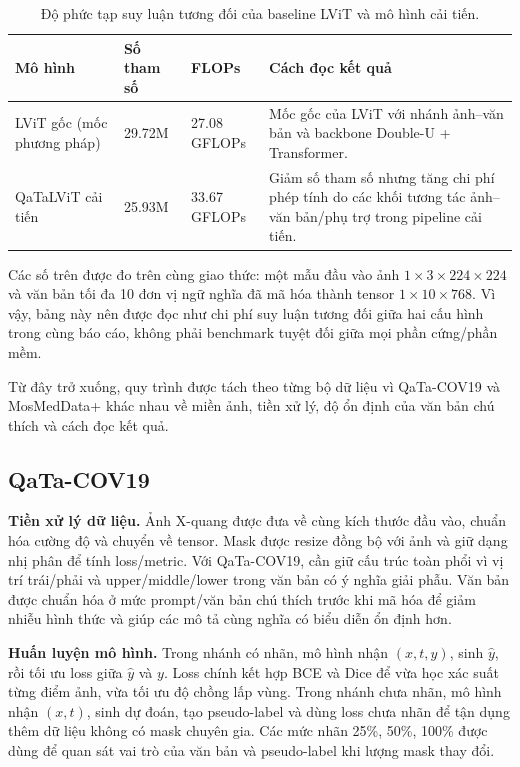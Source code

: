 \begin{table}[H]
  \centering
  \caption{Độ phức tạp suy luận tương đối của baseline LViT và mô hình cải tiến.}
  \label{tab:complexity-comparison}
  \small
  \renewcommand{\arraystretch}{1.15}
  \setlength{\tabcolsep}{4pt}
  \begin{tabularx}{\textwidth}{@{}p{} Y Y Y@{}}
    \toprule
    Mô hình & Số tham số & FLOPs & Cách đọc kết quả \\
    \midrule
    LViT gốc (mốc phương pháp) & 29.72M & 27.08 GFLOPs & Mốc gốc của LViT với nhánh ảnh--văn bản và backbone Double-U + Transformer. \\
    QaTaLViT cải tiến & 25.93M & 33.67 GFLOPs & Giảm số tham số nhưng tăng chi phí phép tính do các khối tương tác ảnh--văn bản/phụ trợ trong pipeline cải tiến. \\
    \bottomrule
  \end{tabularx}
\end{table}

\noindent Các số trên được đo trên cùng giao thức: một mẫu đầu vào ảnh \(1\times3\times224\times224\) và văn bản tối đa 10 đơn vị ngữ nghĩa đã mã hóa thành tensor \(1\times10\times768\). Vì vậy, bảng này nên được đọc như chi phí suy luận tương đối giữa hai cấu hình trong cùng báo cáo, không phải benchmark tuyệt đối giữa mọi phần cứng/phần mềm.
\FloatBarrier

Từ đây trở xuống, quy trình được tách theo từng bộ dữ liệu vì QaTa-COV19 và MosMedData+ khác nhau về miền ảnh, tiền xử lý, độ ổn định của văn bản chú thích và cách đọc kết quả.

\subsection{QaTa-COV19}

\textbf{Tiền xử lý dữ liệu.} Ảnh X-quang được đưa về cùng kích thước đầu vào, chuẩn hóa cường độ và chuyển về tensor. Mask được resize đồng bộ với ảnh và giữ dạng nhị phân để tính loss/metric. Với QaTa-COV19, cần giữ cấu trúc toàn phổi vì vị trí trái/phải và upper/middle/lower trong văn bản có ý nghĩa giải phẫu. Văn bản được chuẩn hóa ở mức prompt/văn bản chú thích trước khi mã hóa để giảm nhiễu hình thức và giúp các mô tả cùng nghĩa có biểu diễn ổn định hơn.

\textbf{Huấn luyện mô hình.} Trong nhánh có nhãn, mô hình nhận \((x,t,y)\), sinh \(\hat{y}\), rồi tối ưu loss giữa \(\hat{y}\) và \(y\). Loss chính kết hợp BCE và Dice để vừa học xác suất từng điểm ảnh, vừa tối ưu độ chồng lấp vùng. Trong nhánh chưa nhãn, mô hình nhận \((x,t)\), sinh dự đoán, tạo pseudo-label và dùng loss chưa nhãn để tận dụng thêm dữ liệu không có mask chuyên gia. Các mức nhãn 25\%, 50\%, 100\% được dùng để quan sát vai trò của văn bản và pseudo-label khi lượng mask thay đổi.

